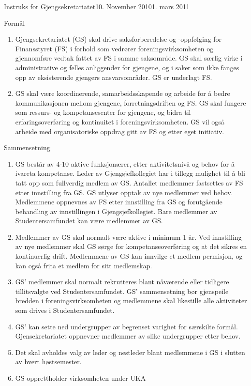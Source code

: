 \begin{instruks}{Instruks for Gjengsekretariatet}{10. November 2010}{1. mars 2011}

    \begin{instruksledd}{Formål}
        \begin{enumerate}
            \item Gjengsekretariatet (GS) skal drive saksforberedelse og -oppfølging for Finansstyret (FS) i forhold som vedrører
foreningsvirksomheten og gjennomføre vedtak fattet av FS i samme saksområde. GS
skal særlig virke i administrative og felles anliggender for gjengene, og i saker som ikke fanges opp av
eksisterende gjengers ansvarsområder. GS er underlagt FS.
            \item  GS skal være koordinerende, samarbeidsskapende og arbeide for å bedre kommunikasjonen
mellom gjengene, forretningsdriften og FS. GS skal fungere som ressurs- og
kompetansesenter for gjengene, og bidra til erfaringsoverføring og kontinuitet i foreningsvirksomheten.
GS vil også arbeide med organisatoriske oppdrag gitt av FS og etter eget initiativ.
        \end{enumerate}
    \end{instruksledd}

    \begin{instruksledd}{Sammensetning}
        \begin{enumerate}
            \item GS består av 4-10 aktive funksjonærer, etter aktivitetsnivå og behov for å ivareta kompetanse. Leder av Gjengsjefkollegiet har i tillegg mulighet til å bli tatt opp som fullverdig medlem av GS.  
Antallet medlemmer fastsettes av FS etter innstilling fra GS. GS
utlyser opptak av nye medlemmer ved behov. Medlemmene oppnevnes av FS etter innstilling fra
GS og forutgående behandling av innstillingen i Gjengsjefkollegiet. Bare medlemmer av
Studentersamfundet kan være medlemmer av GS.
            \item Medlemmer av GS skal normalt være aktive i minimum 1 år. Ved innstilling av nye
medlemmer skal GS sørge for kompetanseoverføring og at det sikres en kontinuerlig drift.
Medlemmene av GS kan innvilge et medlem permisjon, og kan også frita et medlem for sitt
medlemskap.
            \item  GS' medlemmer skal normalt rekrutteres blant nåværende eller tidligere tillitsvalgte ved
Studentersamfundet. GS' sammensetning bør gjenspeile bredden i foreningsvirksomheten og
medlemmene skal likestille alle aktiviteter som drives i Studentersamfundet.
            \item GS' kan sette ned undergrupper av begrenset varighet for særskilte formål. Gjensekretariatet
oppnevner medlemmer av slike undergrupper etter behov.
        \item Det skal avholdes valg av leder og nestleder blant medlemmene i GS i slutten av hvert høstsemester.
            \item GS opprettholder virksomheten under UKA
        \end{enumerate}
    \end{instruksledd}


\end{instruks}
